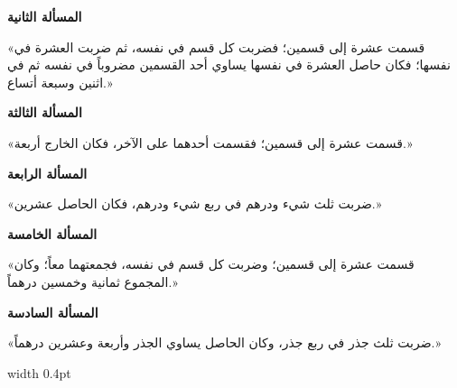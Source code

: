 \documentclass[11pt,a4paper,openany,oneside]{book}
\begin{document}
\newpage

\noindent\begin{minipage}[t]{0.48\textwidth}
\raggedleft

\begin{Arabic}
\textbf{المسألة الثانية}

«قسمت عشرة إلى قسمين؛ فضربت كل قسم في نفسه، ثم ضربت العشرة في نفسها؛ فكان حاصل العشرة في نفسها يساوي أحد القسمين مضروباً في نفسه ثم في اثنين وسبعة أتساع.»

\textbf{المسألة الثالثة}

«قسمت عشرة إلى قسمين؛ فقسمت أحدهما على الآخر، فكان الخارج أربعة.»

\textbf{المسألة الرابعة}

«ضربت ثلث شيء ودرهم في ربع شيء ودرهم، فكان الحاصل عشرين.»

\textbf{المسألة الخامسة}

«قسمت عشرة إلى قسمين؛ وضربت كل قسم في نفسه، فجمعتهما معاً؛ وكان المجموع ثمانية وخمسين درهماً.»

\textbf{المسألة السادسة}

«ضربت ثلث جذر في ربع جذر، وكان الحاصل يساوي الجذر وأربعة وعشرين درهماً.»
\end{Arabic}

\end{minipage}%
\hfill\vrule width 0.4pt\hfill
\end{document}
